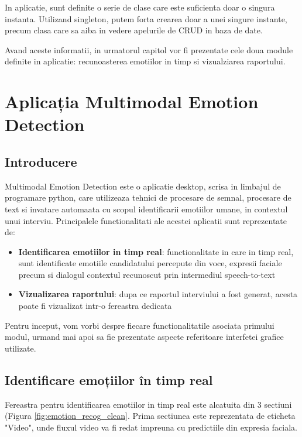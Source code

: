\documentclass[a4paper, 12pt]{report}
\begin{document}
	In aplicatie, sunt definite o serie de clase care este suficienta doar o singura instanta. Utilizand singleton, putem forta crearea doar a unei singure instante, precum clasa care sa aiba in vedere apelurile de CRUD in baza de date.
	
	Avand aceste informatii, in urmatorul capitol vor fi prezentate cele doua module definite in aplicatie: recunoasterea emotiilor in timp si vizualziarea raportului.
	
	\clearpage
	\section{Aplicația Multimodal Emotion Detection}
	\subsection{Introducere}
	
	Multimodal Emotion Detection este o aplicatie desktop, scrisa in limbajul de programare python, care utilizeaza tehnici de procesare de semnal, procesare de text si invatare automaata cu scopul identificarii emotiilor umane, in contextul unui interviu. Principalele functionalitati ale acestei aplicatii sunt reprezentate de:
	\begin{itemize}
		\item \textbf{Identificarea emotiilor in timp real}: functionalitate in care in timp real, sunt identificate emotiile candidatului percepute din voce, expresii faciale precum si dialogul contextul recunoscut prin intermediul speech-to-text
		\item \textbf{Vizualizarea raportului}: dupa ce raportul interviului a fost generat, acesta poate fi vizualizat intr-o fereastra dedicata
	\end{itemize}
	
	Pentru inceput, vom vorbi despre fiecare functionalitatile asociata primului modul, urmand mai apoi sa fie prezentate aspecte referitoare interfetei grafice utilizate.
	
	\clearpage
	\subsection{Identificare emoțiilor în timp real}
	Fereastra pentru identificarea emotiilor in timp real este alcatuita din 3 sectiuni (Figura \ref{fig:emotion_recog_clean}. Prima sectiunea este reprezentata de eticheta "Video", unde fluxul video va fi redat impreuna cu predictiile din expresia faciala.
	
\end{document}
